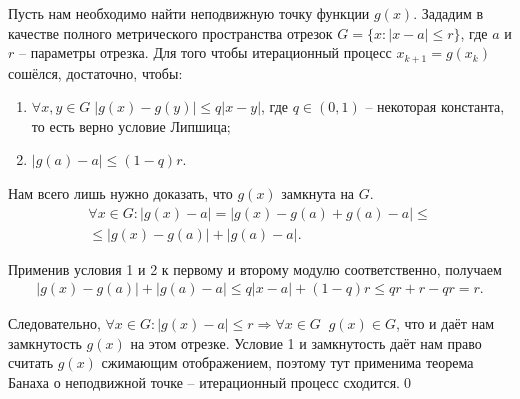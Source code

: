\documentclass[main.tex]{subfile}
\begin{document}
\begin{theorem}
	Пусть нам необходимо найти неподвижную точку функции $g(x)$. Зададим
	в качестве полного метрического пространства отрезок $G=\{x: |x-a| \le r\}$,
	где $a$ и $r$ -- параметры отрезка. Для того чтобы итерационный процесс
	$x_{k+1}=g(x_k)$ сошёлся, достаточно, чтобы:
	\begin{enumerate}
		\item $\forall x,y\in G\;|g(x)-g(y)|\le q|x-y|$, где $q\in(0,1)$ --
			некоторая константа, то есть верно условие Липшица;
		\item $|g(a)-a|\le(1-q)r$.
	\end{enumerate}
\end{theorem}

\beginproof

	Нам всего лишь нужно доказать, что $g(x)$ замкнута на $G$.
	\begin{multline*}
		\forall x\in G:|g(x)-a|=|g(x)-g(a)+g(a)-a|\le \\
		\le|g(x)-g(a)|+|g(a)-a|.
	\end{multline*}

	Применив условия 1 и 2 к первому и второму модулю соответственно, получаем
	\begin{align*}
		|g(x)-g(a)|+|g(a)-a|\le q|x-a|+(1-q)r\le qr+r-qr=r.
	\end{align*}

	Следовательно, $\forall x\in G: |g(x)-a|\le r\Rightarrow\forall x\in G\;\;g(x)\in G$,
	что и даёт нам замкнутость $g(x)$ на этом отрезке. Условие 1 и замкнутость
	даёт нам право считать $g(x)$ сжимающим отображением, поэтому тут применима
	теорема Банаха о неподвижной точке -- итерационный процесс сходится.\qed
\end{document}
